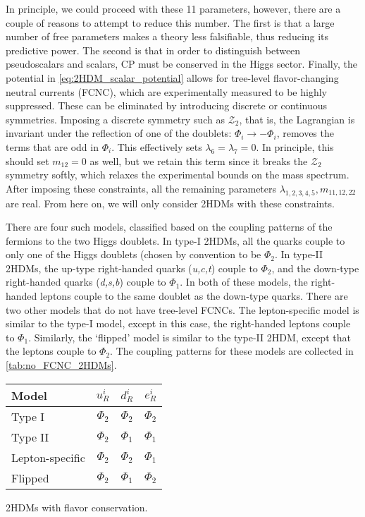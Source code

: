 In principle, we could proceed with these 11 parameters, however, there are a couple of reasons to attempt to reduce this number. The first is that a large number of free parameters makes a theory less falsifiable, thus reducing its predictive power. The second is that in order to distinguish between pseudoscalars and scalars, CP must be conserved in the Higgs sector. Finally, the potential in \eqref{eq:2HDM_scalar_potential} allows for tree-level flavor-changing neutral currents (FCNC), which are experimentally measured to be highly suppressed. These can be eliminated by introducing discrete or continuous symmetries. Imposing a discrete symmetry such as $\mathcal{Z}_2$, that is, the Lagrangian is invariant under the reflection of one of the doublets: $\Phi_i\rightarrow-\Phi_i$, removes the terms that are odd in $\Phi_i$. This effectively sets $\lambda_6=\lambda_7 = 0$. In principle, this should set $m_{12} = 0$ as well, but we retain this term since it breaks the $\mathcal{Z}_2$ symmetry softly, which relaxes the experimental bounds on the mass spectrum.
After imposing these constraints, all the remaining parameters $\lambda_{1,2,3,4,5}, m_{11,12,22}$ are real. From here on, we will only consider 2HDMs with these constraints. 

There are four such models, classified based on the coupling patterns of the fermions to the two Higgs doublets. In type-I 2HDMs, all the quarks couple to only one of the Higgs doublets (chosen by convention to be $\Phi_2$. In type-II 2HDMs, the up-type right-handed quarks (\emph{u,c,t}) couple to $\Phi_2$, and the down-type right-handed quarks (\emph{d,s,b}) couple to $\Phi_1$. In both of these models, the right-handed leptons couple to the same doublet as the down-type quarks. There are two other models that do not have tree-level FCNCs. The lepton-specific model is similar to the type-I model, except in this case, the right-handed leptons couple to $\Phi_1$. Similarly, the `flipped' model is similar to the type-II 2HDM, except that the leptons couple to $\Phi_2$. The coupling patterns for these models are collected in \autoref{tab:no_FCNC_2HDMs}.

\begin{margintable}
\small{
  \begin{tabular}{lccc}
	\toprule
    Model & $u_R^i$ & $d_R^i$  & $e_R^i$\\
    \midrule
    Type I          & $\Phi_2$ & $\Phi_2$ & $\Phi_2$\\
    Type II         & $\Phi_2$ & $\Phi_1$ & $\Phi_1$\\
    Lepton-specific & $\Phi_2$ & $\Phi_2$ & $\Phi_1$\\
    Flipped         & $\Phi_2$ & $\Phi_1$ & $\Phi_2$\\
    \bottomrule
  \end{tabular}}
  \caption{2HDMs with flavor conservation.}
  \label{tab:no_FCNC_2HDMs}
\end{margintable}

